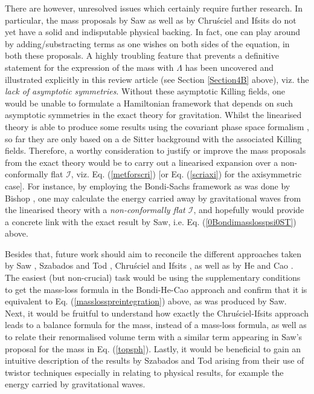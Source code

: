 \documentclass[aps,pre,preprint,superscriptaddress,showpacs,showkeys]{revtex4-1}
\begin{document}
There are however, unresolved issues which certainly require further research. In particular, the mass proposals by Saw \cite{Vee2016} as well as by Chru\'{s}ciel and Ifsits \cite{Chrusciel} do not yet have a solid and indisputable physical backing. In fact, one can play around by adding/substracting terms as one wishes on both sides of the equation, in both these proposals. A highly troubling feature that prevents a definitive statement for the expression of the mass with $\Lambda$ has been uncovered and illustrated explicitly in this review article (see Section \ref{Section4B} above), viz. the \emph{lack of asymptotic symmetries}. Without these asymptotic Killing fields, one would be unable to formulate a Hamiltonian framework that depends on such asymptotic symmetries in the exact theory for gravitation. Whilst the linearised theory is able to produce some results using the covariant phase space formalism \cite{ash2,ash3}, so far they are only based on a de Sitter background with the associated Killing fields. Therefore, a worthy consideration to justify or improve the mass proposals from the exact theory would be to carry out a linearised expansion over a non-conformally flat $\mathcal{I}$, viz. Eq. (\ref{metforscri}) [or Eq. (\ref{scriaxi}) for the axisymmetric case]. For instance, by employing the Bondi-Sachs framework as was done by Bishop \cite{gracos1}, one may calculate the energy carried away by gravitational waves from the linearised theory with a \emph{non-conformally flat $\mathcal{I}$}, and hopefully would provide a concrete link with the exact result by Saw, i.e. Eq. (\ref{0Bondimasslosspsi0ST}) above.

Besides that, future work should aim to reconcile the different approaches taken by Saw \cite{Vee2016}, Szabados and Tod \cite{Szabados}, Chru\'{s}ciel and Ifsits \cite{Chrusciel}, as well as by He and Cao \cite{chi1}. The easiest (but non-crucial) task would be using the supplementary conditions to get the mass-loss formula in the Bondi-He-Cao approach and confirm that it is equivalent to Eq. (\ref{masslosspreintegration}) above, as was produced by Saw. Next, it would be fruitful to understand how exactly the Chru\'{s}ciel-Ifsits approach leads to a balance formula for the mass, instead of a mass-loss formula, as well as to relate their renormalised volume term with a similar term appearing in Saw's proposal for the mass in Eq. (\ref{topsph}). Lastly, it would be beneficial to gain an intuitive description of the results by Szabados and Tod arising from their use of twistor techniques especially in relating to physical results, for example the energy carried by gravitational waves.
\end{document}
